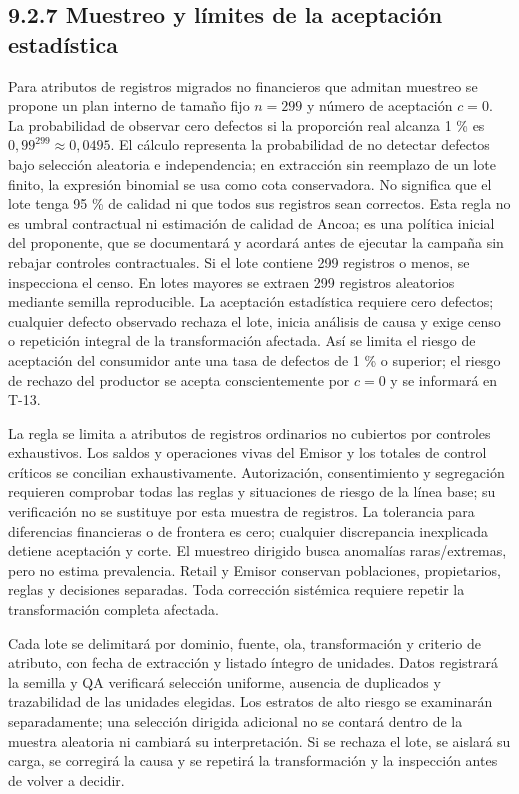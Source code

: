\documentclass[11pt]{article}
\begin{document}
\subsection{9.2.7 Muestreo y límites de la aceptación estadística}

Para atributos de registros migrados no financieros que admitan muestreo se propone un plan interno de tamaño fijo $n=299$ y número de aceptación $c=0$. La probabilidad de observar cero defectos si la proporción real alcanza 1 \% es $0{,}99^{299}\approx0{,}0495$. El cálculo representa la probabilidad de no detectar defectos bajo selección aleatoria e independencia; en extracción sin reemplazo de un lote finito, la expresión binomial se usa como cota conservadora. No significa que el lote tenga 95 \% de calidad ni que todos sus registros sean correctos. Esta regla no es umbral contractual ni estimación de calidad de Ancoa; es una política inicial del proponente, que se documentará y acordará antes de ejecutar la campaña sin rebajar controles contractuales. Si el lote contiene 299 registros o menos, se inspecciona el censo. En lotes mayores se extraen 299 registros aleatorios mediante semilla reproducible. La aceptación estadística requiere cero defectos; cualquier defecto observado rechaza el lote, inicia análisis de causa y exige censo o repetición integral de la transformación afectada. Así se limita el riesgo de aceptación del consumidor ante una tasa de defectos de 1 \% o superior; el riesgo de rechazo del productor se acepta conscientemente por  $c=0$  y se informará en T-13.

La regla se limita a atributos de registros ordinarios no cubiertos por controles exhaustivos. Los saldos y operaciones vivas del Emisor y los totales de control críticos se concilian exhaustivamente. Autorización, consentimiento y segregación requieren comprobar todas las reglas y situaciones de riesgo de la línea base; su verificación no se sustituye por esta muestra de registros. La tolerancia para diferencias financieras o de frontera es cero; cualquier discrepancia inexplicada detiene aceptación y corte. El muestreo dirigido busca anomalías raras/extremas, pero no estima prevalencia. Retail y Emisor conservan poblaciones, propietarios, reglas y decisiones separadas. Toda corrección sistémica requiere repetir la transformación completa afectada.

Cada lote se delimitará por dominio, fuente, ola, transformación y criterio de atributo, con fecha de extracción y listado íntegro de unidades. Datos registrará la semilla y QA verificará selección uniforme, ausencia de duplicados y trazabilidad de las unidades elegidas. Los estratos de alto riesgo se examinarán separadamente; una selección dirigida adicional no se contará dentro de la muestra aleatoria ni cambiará su interpretación. Si se rechaza el lote, se aislará su carga, se corregirá la causa y se repetirá la transformación y la inspección antes de volver a decidir.
\end{document}

